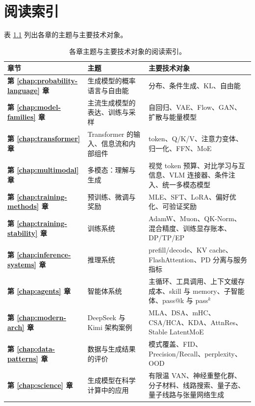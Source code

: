 \chapter{阅读索引}

表 \ref{tab:content-map} 列出各章的主题与主要技术对象。

\begin{table}[ht]
\centering\small
\begin{tabularx}{\textwidth}{>{\bfseries}p{28mm} X X}
\toprule
章节 & 主题 & 主要技术对象\\
\midrule
第 \ref{chap:probability-language} 章 & 生成模型的概率语言与自由能 & 分布、条件生成、KL、自由能\\
第 \ref{chap:model-families} 章 & 主流生成模型的表达、训练与采样 & 自回归、VAE、Flow、GAN、扩散与能量模型\\
第 \ref{chap:transformer} 章 & Transformer 的输入、信息流和内部组件 & token、Q/K/V、注意力变体、归一化、FFN、MoE\\
第 \ref{chap:multimodal} 章 & 多模态：理解与生成 & 视觉 token 预算、对比学习与互信息、VLM 连接器、条件注入、统一多模态模型\\
第 \ref{chap:training-methods} 章 & 预训练、微调与奖励 & MLE、SFT、LoRA、偏好优化、可验证奖励\\
第 \ref{chap:training-stability} 章 & 训练系统 & AdamW、Muon、QK-Norm、混合精度、训练显存账本、DP/TP/EP\\
第 \ref{chap:inference-systems} 章 & 推理系统 & prefill/decode、KV cache、FlashAttention、PD 分离与服务指标\\
第 \ref{chap:agents} 章 & 智能体系统 & 主循环、工具调用、上下文缓存成本、skill 与 memory、子智能体、pass@k 与 pass\(^k\)\\
第 \ref{chap:modern-arch} 章 & DeepSeek 与 Kimi 架构案例 & MLA、DSA、mHC、CSA/HCA、KDA、AttnRes、Stable LatentMoE\\
第 \ref{chap:data-patterns} 章 & 数据与生成结果的评价 & 模式覆盖、FID、Precision/Recall、perplexity、OOD\\
第 \ref{chap:science} 章 & 生成模型在科学计算中的应用 & 有限温 VAN、神经重整化群、分子材料、线路搜索、量子态、量子线路与张量网络生成\\
\bottomrule
\end{tabularx}
\caption{各章主题与主要技术对象的阅读索引。}
\label{tab:content-map}
\end{table}
